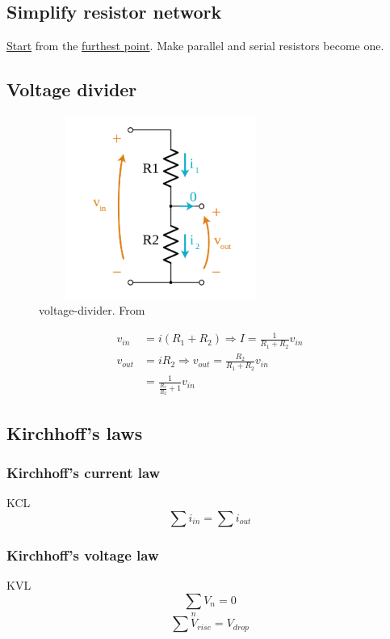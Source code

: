 \subsection{Simplify resistor network}
\underline{Start} from the \underline{furthest point}. Make parallel and serial resistors become one.

\newpage
\subsection{Voltage divider}
\begin{figure}[h]
    \vspace{10mm}
    \centering
    \includegraphics[width=8cm, height=6cm]{image/voltage-divider.png}
    \caption{voltage-divider. From \cite{}}
\end{figure}

\begin{align*}
  v_{in} &= i(R_1+R_2) \Rightarrow I = \frac{1}{R_1+R_2}v_{in} \\
  v_{out} &= iR_2 \Rightarrow v_{out} = \frac{R_2}{R_1+R_2}v_{in} \\
  &= \frac{1}{\frac{R_1}{R_2}+1}v_{in}
\end{align*}

\subsection{Kirchhoff's laws}
\subsubsection{Kirchhoff's current law}
KCL
\begin{equation} \sum i_{in} = \sum i_{out} \end{equation}

\subsubsection{Kirchhoff's voltage law}
KVL
\begin{equation} \sum_n V_{n} = 0 \end{equation}
\begin{equation} \sum V_{rise} = V_{drop} \end{equation}


